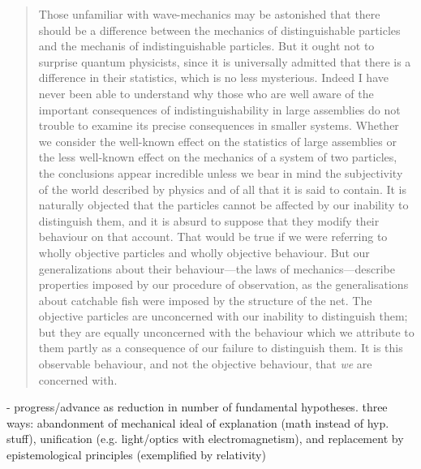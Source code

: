 \begin{quote}
    Those unfamiliar with wave-mechanics may be astonished that there should be a difference between the mechanics of distinguishable particles and the mechanis of indistinguishable particles.  But it ought not to surprise quantum physicists, since it is universally admitted that there is a difference in their statistics, which is no less mysterious.  Indeed I have never been able to understand why those who are well aware of the important consequences of indistinguishability in large assemblies do not trouble to examine its precise consequences in smaller systems.  Whether we consider the well-known effect on the statistics of large assemblies or the less well-known effect on the mechanics of a system of two particles, the conclusions appear incredible unless we bear in mind the subjectivity of the world described by physics and of all that it is said to contain.  It is naturally objected that the particles cannot be affected by our inability to distinguish them, and it is absurd to suppose that they modify their behaviour on that account.  That would be true if we were referring to wholly objective particles and wholly objective behaviour.  But our generalizations about their behaviour---the laws of mechanics---describe properties imposed by our procedure of observation, as the generalisations about catchable fish were imposed by the structure of the net.  The objective particles are unconcerned with our inability to distinguish them; but they are equally unconcerned with the behaviour which we attribute to them partly as a consequence of our failure to distinguish them.  It is this observable behaviour, and not the objective behaviour, that \emph{we} are concerned with. 
    
    \citep[p. 35-37]{Eddington1939}
\end{quote}

- progress/advance as reduction in number of fundamental hypotheses.  three ways: abandonment of mechanical ideal of explanation (math instead of hyp. stuff), unification (e.g. light/optics with electromagnetism), and replacement by epistemological principles (exemplified by relativity)

